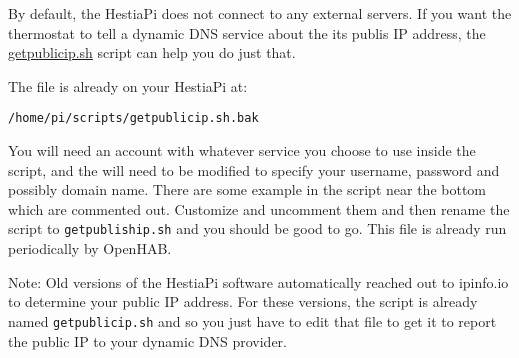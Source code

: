 By default, the HestiaPi does not connect to any external servers. If you want
the thermostat to tell a dynamic DNS service about the its publis IP address,
the
\href{https://github.com/HestiaPi/hestia-touch-openhab/blob/ONE/home/pi/scripts/getpublicip.sh}
{getpublicip.sh} script can help you do just that.

The file is already on your HestiaPi at:

\texttt{/home/pi/scripts/getpublicip.sh.bak}

You will need an account with whatever service you choose to use inside the
script, and the will need to be modified to specify your username, password
and possibly domain name. There are some example in the script near the bottom
which are commented out. Customize and uncomment them and then rename the
script to \texttt{getpubliship.sh} and you should be good to go. This file is
already run periodically by OpenHAB.

Note: Old versions of the HestiaPi software automatically reached out to
ipinfo.io to determine your public IP address. For these versions, the script
is already named \texttt{getpublicip.sh} and so you just have to edit that
file to get it to report the public IP to your dynamic DNS provider.
